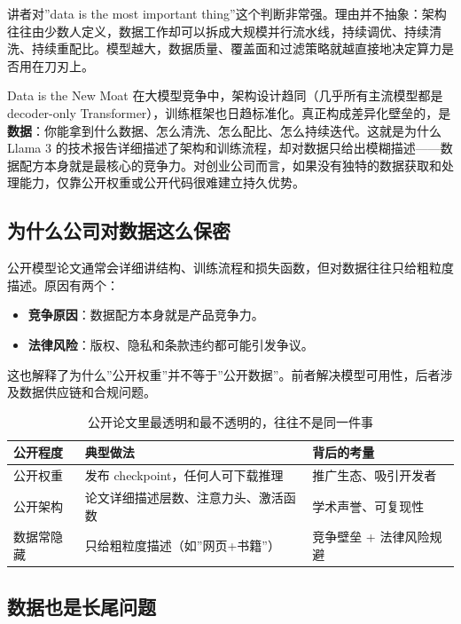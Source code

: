 \documentclass[a4paper]{article}
\begin{document}
讲者对”data is the most important thing”这个判断非常强。理由并不抽象：架构往往由少数人定义，数据工作却可以拆成大规模并行流水线，持续调优、持续清洗、持续重配比。模型越大，数据质量、覆盖面和过滤策略就越直接地决定算力是否用在刀刃上。

\begin{importantbox}{Data is the New Moat}
在大模型竞争中，架构设计趋同（几乎所有主流模型都是 decoder-only Transformer），训练框架也日趋标准化。真正构成差异化壁垒的，是\textbf{数据}：你能拿到什么数据、怎么清洗、怎么配比、怎么持续迭代。这就是为什么 Llama 3 的技术报告详细描述了架构和训练流程，却对数据只给出模糊描述——数据配方本身就是最核心的竞争力。对创业公司而言，如果没有独特的数据获取和处理能力，仅靠公开权重或公开代码很难建立持久优势。
\end{importantbox}

\subsection{为什么公司对数据这么保密}

公开模型论文通常会详细讲结构、训练流程和损失函数，但对数据往往只给粗粒度描述。原因有两个：
\begin{itemize}
    \item \textbf{竞争原因}：数据配方本身就是产品竞争力。
    \item \textbf{法律风险}：版权、隐私和条款违约都可能引发争议。
\end{itemize}

这也解释了为什么”公开权重”并不等于”公开数据”。前者解决模型可用性，后者涉及数据供应链和合规问题。

\begin{table}[H]
\centering
\begin{tabular}{p{}p{}p{}}
\toprule
\textbf{公开程度} & \textbf{典型做法} & \textbf{背后的考量} \\
\midrule
公开权重 & 发布 checkpoint，任何人可下载推理 & 推广生态、吸引开发者 \\
公开架构 & 论文详细描述层数、注意力头、激活函数 & 学术声誉、可复现性 \\
数据常隐藏 & 只给粗粒度描述（如”网页+书籍”） & 竞争壁垒 + 法律风险规避 \\
\bottomrule
\end{tabular}
\caption{公开论文里最透明和最不透明的，往往不是同一件事}
\end{table}

\subsection{数据也是长尾问题}
\end{document}
